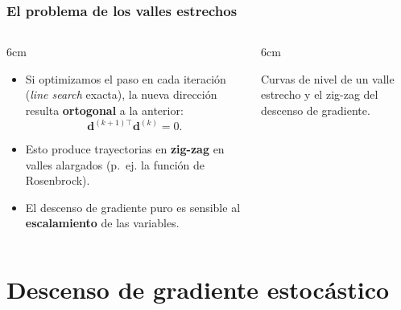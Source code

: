 \documentclass[aspectratio=169, 10pt]{beamer}
\newcommand{\dv}{\bm{d}}
\begin{document}
\begin{frame}
\frametitle{El problema de los valles estrechos}
\begin{columns}[T]
\begin{column}{6cm}
\begin{itemize}
	\item Si optimizamos el paso en cada iteraci\'on (\emph{line search} exacta), la nueva direcci\'on resulta \textbf{ortogonal} a la anterior:
	\[ \dv^{(k+1)\top}\dv^{(k)} = 0. \]
	\pause
	\item Esto produce trayectorias en \textbf{zig-zag} en valles alargados (p.~ej. la funci\'on de Rosenbrock).
	\pause
	\item El descenso de gradiente puro es sensible al \textbf{escalamiento} de las variables.
\end{itemize}
\end{column}
\begin{column}{6cm}
\begin{center}
\end{center}
\footnotesize Curvas de nivel de un valle estrecho y el zig-zag del descenso de gradiente.
\end{column}
\end{columns}
\end{frame}

\section{Descenso de gradiente estoc\'astico}
\end{document}
